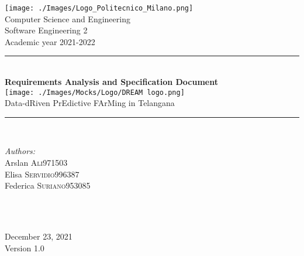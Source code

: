 \documentclass[a4paper,11pt]{report}
\begin{document}
\begin{titlepage}

\newcommand{\HRule}{\rule{\linewidth}{0.1mm}}

\center 

\texttt{[image: ./Images/Logo\_Politecnico\_Milano.png]}\\[0.5cm] 

{\Large Computer Science and Engineering}\\[0.4cm] 
{\large Software Engineering 2}\\[0.4cm] 
{\large Academic year 2021-2022}\\[0.5cm] 

\HRule \\[1 cm]
{\LARGE \textbf{Requirements Analysis and Specification Document}} \\[0.7cm]
\texttt{[image: ./Images/Mocks/Logo/DREAM logo.png]}\\[0.5cm] 
{\LARGE Data-dRiven PrEdictive FArMing in Telangana} \\[0.7cm]
\HRule \\[1cm]
\raggedright

\begin{minipage}{0.55\textwidth}
\begin{flushleft} \large
\emph{Authors:}\\
Arslan \textsc{Ali}\hfill 971503 \\
Elisa \textsc{Servidio}\hfill 996387 \\
Federica \textsc{Suriano}\hfill 953085 \\
\end{flushleft}
\end{minipage}\\[0.7 cm]
~

\center

{\large December 23, 2021}\\[0.3 cm]
{\large Version 1.0}\\

\vfill 
\end{titlepage}

\newpage

\tableofcontents
{}
\listoftables
\newpage
\listoffigures
\newpage







\end{document}
